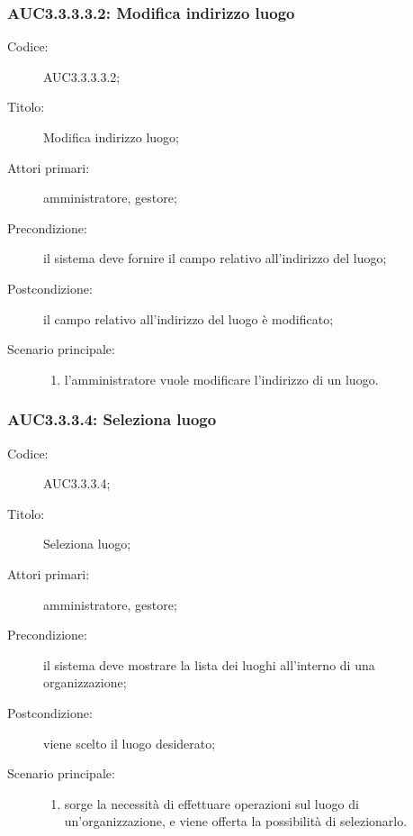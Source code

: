 \documentclass[../../../analisi-dei-requisiti.tex]{subfiles}
\begin{document}
\subsubsection{AUC3.3.3.3.2: Modifica indirizzo luogo}%
\label{subs:AUC3.3.3.3.2}
\begin{description}
  \item[Codice:] AUC3.3.3.3.2;
  \item[Titolo:] Modifica indirizzo luogo;
  \item[Attori primari:] amministratore, gestore;
  \item[Precondizione:] il sistema deve fornire il campo relativo all'indirizzo del luogo;
  \item[Postcondizione:] il campo relativo all'indirizzo del luogo è modificato;
  \item[Scenario principale:]
  \begin{enumerate}
    \item l'amministratore vuole modificare l'indirizzo di un luogo.
  \end{enumerate}
\end{description}

\subsubsection{AUC3.3.3.4: Seleziona luogo}%
\label{subs:AUC3.3.3.4}
\begin{description}
  \item[Codice:] AUC3.3.3.4;
  \item[Titolo:] Seleziona luogo;
  \item[Attori primari:] amministratore, gestore;
  \item[Precondizione:] il sistema deve mostrare la lista dei luoghi all'interno di una organizzazione;
  \item[Postcondizione:] viene scelto il luogo desiderato;
  \item[Scenario principale:]
  \begin{enumerate}
    \item sorge la necessità di effettuare operazioni sul luogo di un'organizzazione, e viene offerta la possibilità di selezionarlo.
  \end{enumerate}
\end{description}

\end{document}
